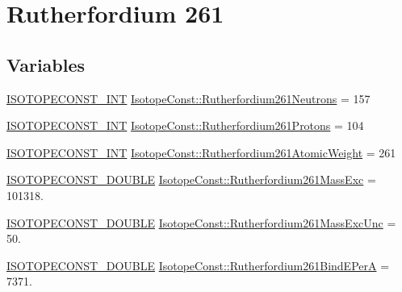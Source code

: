 \hypertarget{group___isotope_const-_rutherfordium-_rf261}{}\section{Rutherfordium 261}
\label{group___isotope_const-_rutherfordium-_rf261}
\subsection*{Variables}
\begin{DoxyCompactItemize}
\item 
\mbox{\hyperlink{group___isotope_const-_macros_ga5f18360b3e99483a35c32d789e62621c}{I\+S\+O\+T\+O\+P\+E\+C\+O\+N\+S\+T\+\_\+\+I\+NT}} \mbox{\hyperlink{group___isotope_const-_rutherfordium-_rf261_ga61a3bb94da9281c56d6286d21b8d25bf}{Isotope\+Const\+::\+Rutherfordium261\+Neutrons}} = 157
\item 
\mbox{\hyperlink{group___isotope_const-_macros_ga5f18360b3e99483a35c32d789e62621c}{I\+S\+O\+T\+O\+P\+E\+C\+O\+N\+S\+T\+\_\+\+I\+NT}} \mbox{\hyperlink{group___isotope_const-_rutherfordium-_rf261_ga05304b5405109c4969addb6f41c761db}{Isotope\+Const\+::\+Rutherfordium261\+Protons}} = 104
\item 
\mbox{\hyperlink{group___isotope_const-_macros_ga5f18360b3e99483a35c32d789e62621c}{I\+S\+O\+T\+O\+P\+E\+C\+O\+N\+S\+T\+\_\+\+I\+NT}} \mbox{\hyperlink{group___isotope_const-_rutherfordium-_rf261_ga20d02417a0fca27503c16a4dd4f8ef2a}{Isotope\+Const\+::\+Rutherfordium261\+Atomic\+Weight}} = 261
\item 
\mbox{\hyperlink{group___isotope_const-_macros_ga8f45a7272ce02c0b4c65c44636ed719a}{I\+S\+O\+T\+O\+P\+E\+C\+O\+N\+S\+T\+\_\+\+D\+O\+U\+B\+LE}} \mbox{\hyperlink{group___isotope_const-_rutherfordium-_rf261_ga63b12d635c762f21fd519d77634782bc}{Isotope\+Const\+::\+Rutherfordium261\+Mass\+Exc}} = 101318.
\item 
\mbox{\hyperlink{group___isotope_const-_macros_ga8f45a7272ce02c0b4c65c44636ed719a}{I\+S\+O\+T\+O\+P\+E\+C\+O\+N\+S\+T\+\_\+\+D\+O\+U\+B\+LE}} \mbox{\hyperlink{group___isotope_const-_rutherfordium-_rf261_ga66c71c08e01a257877944339cc8c88d1}{Isotope\+Const\+::\+Rutherfordium261\+Mass\+Exc\+Unc}} = 50.
\item 
\mbox{\hyperlink{group___isotope_const-_macros_ga8f45a7272ce02c0b4c65c44636ed719a}{I\+S\+O\+T\+O\+P\+E\+C\+O\+N\+S\+T\+\_\+\+D\+O\+U\+B\+LE}} \mbox{\hyperlink{group___isotope_const-_rutherfordium-_rf261_gada5d94af160987d114c641e15546daad}{Isotope\+Const\+::\+Rutherfordium261\+Bind\+E\+PerA}} = 7371.

\end{DoxyCompactItemize}
